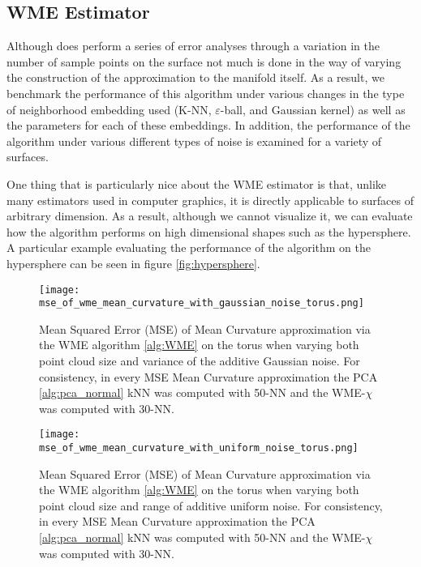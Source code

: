 \documentclass{article}
\begin{document}
\subsection{WME Estimator}
Although \cite{Cao_2021} does perform a series of error analyses through a variation in the number of sample points on the surface not much is done in the way of varying the construction of the approximation to the manifold itself. As a result, we benchmark the performance of this algorithm under various changes in the type of neighborhood embedding used (K-NN, $\varepsilon$-ball, and Gaussian kernel) as well as the parameters for each of these embeddings. In addition, the performance of the algorithm under various different types of noise is examined for a variety of surfaces.   

One thing that is particularly nice about the WME estimator is that, unlike many estimators used in computer graphics, it is directly applicable to surfaces of arbitrary dimension. As a result, although we cannot visualize it, we can evaluate how the algorithm performs on high dimensional shapes such as the hypersphere. A particular example evaluating the performance of the algorithm on the hypersphere can be seen in figure \ref{fig:hypersphere}.  


\begin{figure}
    \centering
    \texttt{[image: mse\_of\_wme\_mean\_curvature\_with\_gaussian\_noise\_torus.png]}
    \caption{Mean Squared Error (MSE) of Mean Curvature approximation via the WME algorithm \eqref{alg:WME} on the torus when varying both point cloud size and variance of the additive Gaussian noise. For consistency, in every MSE Mean Curvature approximation the PCA \eqref{alg:pca_normal} kNN was computed with 50-NN and the WME-$\chi$ was computed with 30-NN.}
    \label{fig:mse_wme_mcurv_gaussian_torus}
\end{figure}

\begin{figure}
    \centering
    \texttt{[image: mse\_of\_wme\_mean\_curvature\_with\_uniform\_noise\_torus.png]}
    \caption{Mean Squared Error (MSE) of Mean Curvature approximation via the WME algorithm \eqref{alg:WME} on the torus when varying both point cloud size and range of additive uniform noise. For consistency, in every MSE Mean Curvature approximation the PCA \eqref{alg:pca_normal} kNN was computed with 50-NN and the WME-$\chi$ was computed with 30-NN.}
    \label{fig:mse_wme_mcurv_uniform_torus}
\end{figure}
\end{document}
